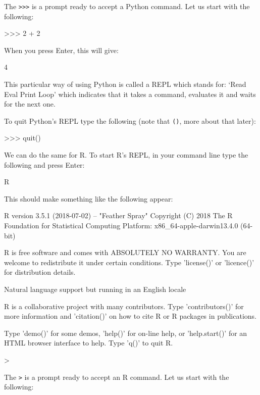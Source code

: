 The \texttt{>>>} is a prompt ready to accept a Python command. Let
us start with the following:

\begin{pyin-no-test}
>>> 2 + 2
\end{pyin-no-test}

When you press Enter, this will give:

\begin{pyout-no-test}
4
\end{pyout-no-test}

This particular way of using Python is called a REPL which stands for: `Read
Eval Print Loop' which indicates that it takes a command, evaluates it and waits
for the next one.

To quit Python's REPL type the following (note that \texttt{()},
more about that later):

\begin{pyin-no-test}
>>> quit()
\end{pyin-no-test}

We can do the same for R. To start R's REPL, in your command line type the
following and press Enter:

\begin{cliin}
R
\end{cliin}

This should make something like the following appear:

\begin{cliout}
R version 3.5.1 (2018-07-02) -- "Feather Spray"
Copyright (C) 2018 The R Foundation for Statistical Computing
Platform: x86_64-apple-darwin13.4.0 (64-bit)

R is free software and comes with ABSOLUTELY NO WARRANTY.
You are welcome to redistribute it under certain conditions.
Type 'license()' or 'licence()' for distribution details.

  Natural language support but running in an English locale

R is a collaborative project with many contributors.
Type 'contributors()' for more information and
'citation()' on how to cite R or R packages in publications.

Type 'demo()' for some demos, 'help()' for on-line help, or
'help.start()' for an HTML browser interface to help.
Type 'q()' to quit R.

>
\end{cliout}

The \texttt{>} is a prompt ready to accept an R command. Let
us start with the following:

